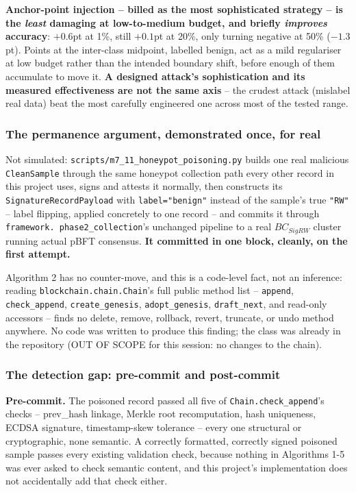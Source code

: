 \documentclass[conference]{IEEEtran}
\begin{document}
\textbf{Anchor-point injection -- billed as the most sophisticated strategy -- is the
\emph{least} damaging at low-to-medium budget, and briefly \emph{improves} accuracy}: $+0.6$pt at
1\%, still $+0.1$pt at 20\%, only turning negative at 50\% ($-1.3$pt). Points at the inter-class
midpoint, labelled benign, act as a mild regulariser at low budget rather than the intended
boundary shift, before enough of them accumulate to move it. \textbf{A designed attack's
sophistication and its measured effectiveness are not the same axis} -- the crudest attack
(mislabel real data) beat the most carefully engineered one across most of the tested range.

\subsubsection{The permanence argument, demonstrated once, for real}

Not simulated: \texttt{scripts/m7\_11\_honeypot\_poisoning.py} builds one real malicious
\texttt{CleanSample} through the same honeypot collection path every other record in this
project uses, signs and attests it normally, then constructs its \texttt{SignatureRecordPayload}
with \texttt{label="benign"} instead of the sample's true \texttt{"RW"} -- label flipping,
applied concretely to one record -- and commits it through \texttt{framework.
phase2\_collection}'s unchanged pipeline to a real $BC_{SigRW}$ cluster running actual pBFT
consensus. \textbf{It committed in one block, cleanly, on the first attempt.}

Algorithm 2 has no counter-move, and this is a code-level fact, not an inference: reading
\texttt{blockchain.chain.Chain}'s full public method list --
\texttt{append}, \texttt{check\_append}, \texttt{create\_genesis}, \texttt{adopt\_genesis},
\texttt{draft\_next}, and read-only accessors -- finds no delete, remove, rollback, revert,
truncate, or undo method anywhere. No code was written to produce this finding; the class was
already in the repository (OUT OF SCOPE for this session: no changes to the chain).

\subsubsection{The detection gap: pre-commit and post-commit}

\textbf{Pre-commit.} The poisoned record passed all five of \texttt{Chain.check\_append}'s checks
-- prev\_hash linkage, Merkle root recomputation, hash uniqueness, ECDSA signature, timestamp-skew
tolerance -- every one structural or cryptographic, none semantic. A correctly formatted,
correctly signed poisoned sample passes every existing validation check, because nothing in
Algorithms 1-5 was ever asked to check semantic content, and this project's implementation does
not accidentally add that check either.
\end{document}
